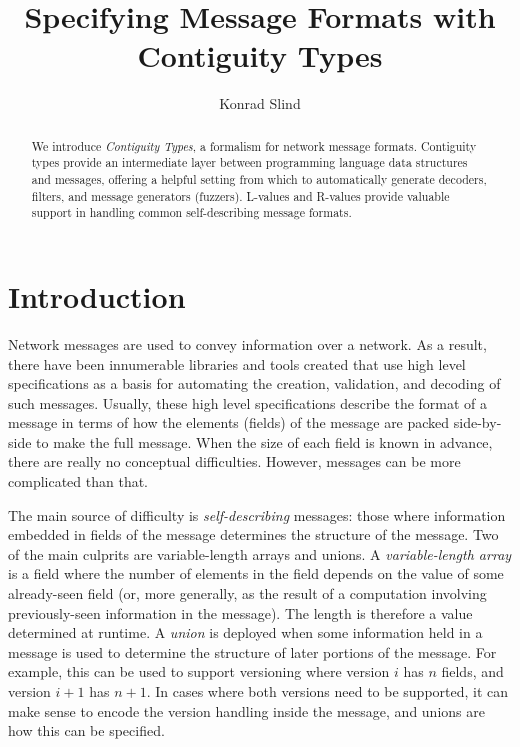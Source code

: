 \documentclass[svgnames]{llncs}
\begin{document}

\title{Specifying Message Formats with \\ Contiguity Types}

\author{Konrad Slind}
\maketitle

\begin{abstract}
We introduce \emph{Contiguity Types}, a formalism for network message
formats. Contiguity types provide an intermediate layer between
programming language data structures and messages, offering a helpful
setting from which to automatically generate decoders, filters, and
message generators (fuzzers). L-values and R-values provide valuable
support in handling common self-describing message formats.
\end{abstract}


\section{Introduction}\label{sec:intro}

Network messages are used to convey information over a network. As a
result, there have been innumerable libraries and tools created that
use high level specifications as a basis for automating the creation,
validation, and decoding of such messages. Usually, these high level
specifications describe the format of a message in terms of how the
elements (fields) of the message are packed side-by-side to make the
full message. When the size of each field is known in advance, there
are really no conceptual difficulties. However, messages can be more
complicated than that.

The main source of difficulty is \emph{self-describing} messages:
those where information embedded in fields of the message determines
the structure of the message. Two of the main culprits are
variable-length arrays and unions. A \emph{variable-length array} is a
field where the number of elements in the field depends on the value
of some already-seen field (or, more generally, as the result of a
computation involving previously-seen information in the message).
The length is therefore a value determined at runtime. A \emph{union}
is deployed when some information held in a message is used to
determine the structure of later portions of the message. For example,
this can be used to support versioning where version $i$ has $n$
fields, and version $i+1$ has $n+1$. In cases where both versions need
to be supported, it can make sense to encode the version handling
inside the message, and unions are how this can be specified.
\end{document}
